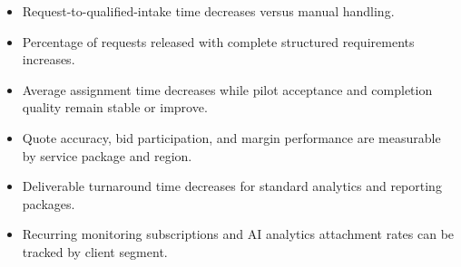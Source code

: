 \documentclass[11pt,a4paper]{article}
\begin{document}
\begin{itemize}[leftmargin=*]
    \item Request-to-qualified-intake time decreases versus manual handling.
    \item Percentage of requests released with complete structured requirements increases.
    \item Average assignment time decreases while pilot acceptance and completion quality remain stable or improve.
    \item Quote accuracy, bid participation, and margin performance are measurable by service package and region.
    \item Deliverable turnaround time decreases for standard analytics and reporting packages.
    \item Recurring monitoring subscriptions and AI analytics attachment rates can be tracked by client segment.
\end{itemize}
\end{document}
